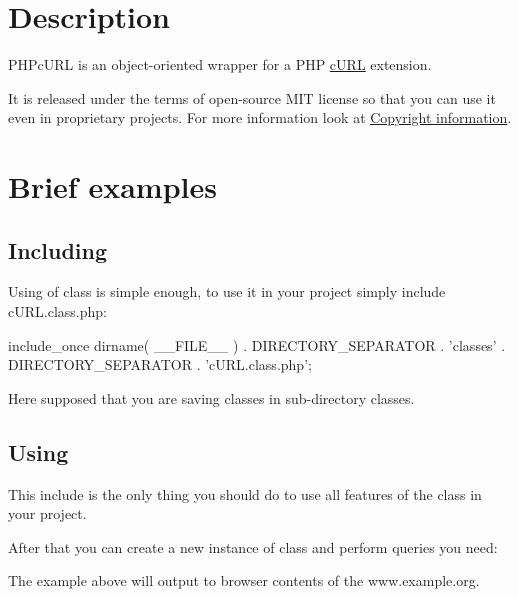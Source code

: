 \hypertarget{index_Description}{}\section{Description}\label{index_Description}
PHPcURL is an object-\/oriented wrapper for a PHP \hyperlink{a00002}{cURL} extension.

It is released under the terms of open-\/source MIT license so that you can use it even in proprietary projects. For more information look at \hyperlink{a00001}{Copyright information}.\hypertarget{index_example}{}\section{Brief examples}\label{index_example}
\hypertarget{index_Including}{}\subsection{Including}\label{index_Including}
Using of class is simple enough, to use it in your project simply include {\ttfamily cURL.class.php}: 
\begin{DoxyCode}
 include_once dirname( __FILE__ ) . DIRECTORY_SEPARATOR . 'classes'
        . DIRECTORY_SEPARATOR . 'cURL.class.php';
\end{DoxyCode}
 Here supposed that you are saving classes in sub-\/directory {\ttfamily classes}. \hypertarget{index_Using}{}\subsection{Using}\label{index_Using}
This include is the only thing you should do to use all features of the class in your project.

After that you can create a new instance of class and perform queries you need: 
 The example above will output to browser contents of the www.example.org.

